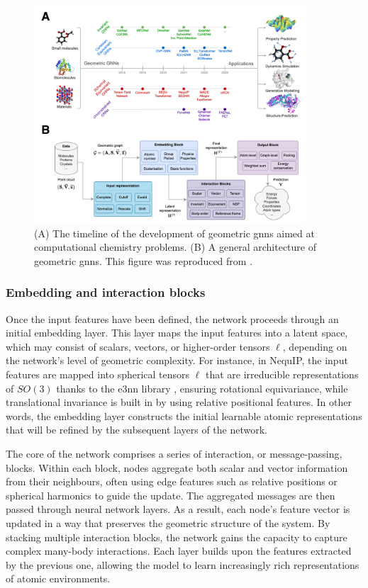 \begin{figure}[t!]
    \centering
    \includegraphics[width=0.9\textwidth]{Figures/2_Theory/equivariant_gnns.png}
    \caption{(A) The timeline of the development of geometric \acp{gnn} aimed at computational chemistry problems. (B) A general architecture of geometric \acp{gnn}. This figure was reproduced from \citep{duvalHitchhikersGuideGeometric2024}.}
    \label{fig:equivariant_gnns}
\end{figure}

\subsubsection{Embedding and interaction blocks}
Once the input features have been defined, the network proceeds through an initial embedding layer. This layer maps the input features into a latent space, which may consist of scalars, vectors, or higher-order tensors $\ell$, depending on the network’s level of geometric complexity. For instance, in NequIP, the input features are mapped into spherical tensors $\ell$ that are irreducible representations of $SO(3)$ thanks to the e3nn library \citep{geigerE3nnEuclideanNeural2022}, ensuring rotational equivariance, while translational invariance is built in by using relative positional features. In other words, the embedding layer constructs the initial learnable atomic representations that will be refined by the subsequent layers of the network.

The core of the network comprises a series of interaction, or message-passing, blocks. Within each block, nodes aggregate both scalar and vector information from their neighbours, often using edge features such as relative positions or spherical harmonics to guide the update. The aggregated messages are then passed through neural network layers. As a result, each node's feature vector is updated in a way that preserves the geometric structure of the system. By stacking multiple interaction blocks, the network gains the capacity to capture complex many-body interactions. Each layer builds upon the features extracted by the previous one, allowing the model to learn increasingly rich representations of atomic environments.

